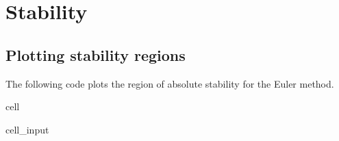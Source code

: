 \documentclass[letterpaper,10pt,english]{jupyterBook}
\begin{document}
\section{Stability}
\label{\detokenize{8_Appendices/8.1_Python:stability}}

\subsection{Plotting stability regions}
\label{\detokenize{8_Appendices/8.1_Python:plotting-stability-regions}}
\sphinxAtStartPar
The following code plots the region of absolute stability for the Euler method.

\begin{sphinxuseclass}{cell}\begin{sphinxVerbatimInput}

\begin{sphinxuseclass}{cell_input}
\begin{sphinxVerbatim}[commandchars=\\\{\}]
        
      

    


\end{sphinxVerbatim}
\end{sphinxuseclass}
\end{sphinxVerbatimInput}
\end{sphinxuseclass}
\end{document}
